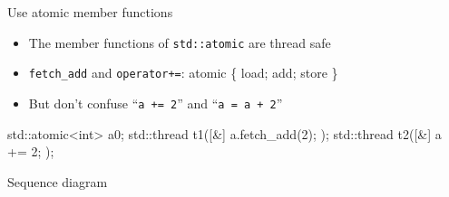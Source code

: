 \begin{frame}[fragile]
  \begin{block}{Use atomic member functions}
    \begin{itemize}
      \item The member functions of \texttt{std::atomic} are thread safe
      \item \texttt{fetch_add} and \texttt{operator+=}: atomic \{ load; add; store \}
      \item But don't confuse ``\texttt{a += 2}'' and ``\texttt{a = a + 2}''
    \end{itemize}
  \end{block}
  \begin{exampleblock}{}
    \begin{cppcode*}{}
      std::atomic<int> a{0};
      std::thread t1([&]{ a.fetch_add(2); });
      std::thread t2([&]{ a += 2; });
    \end{cppcode*}
  \end{exampleblock}
  \begin{block}{Sequence diagram}
  \end{block}
\end{frame}

